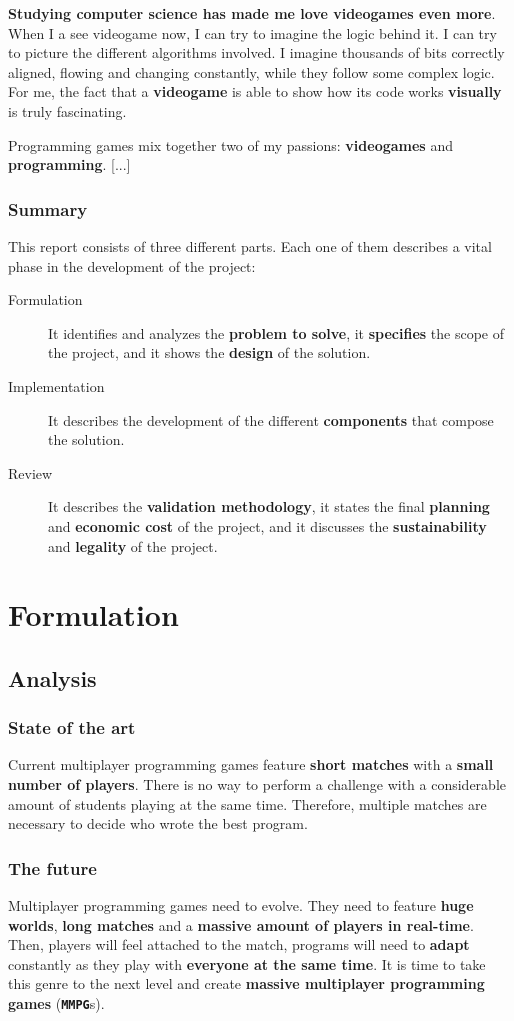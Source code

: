 \documentclass[a4paper,11pt,titlepage,abstract,numbers=noenddot,automark,mnsy,intlimits,rgb,dvipsnames]{report}
\begin{document}
\textbf{Studying computer science has made me love videogames even more}. When I a see videogame now, I can try to
imagine the logic
behind it. I can try to picture the different algorithms involved. I imagine thousands of bits correctly aligned,
flowing and changing constantly, while they follow some complex logic. For me, the fact that a \textbf{videogame} is
able to show how its code works \textbf{visually} is truly fascinating.

Programming games mix together two of my passions: \textbf{videogames} and \textbf{programming}. [...]
\section{Summary}
This report consists of three different parts. Each one of them describes a vital phase in the development of
the project:
\begin{description}
\item[Formulation]
It identifies and analyzes the \textbf{problem to solve}, it \textbf{specifies} the scope of
  the project, and it shows the \textbf{design} of the solution.
\item[Implementation]
It describes the development of the different \textbf{components} that compose the solution.
\item[Review]
It describes the \textbf{validation methodology}, it states the final \textbf{planning} and \textbf{economic cost}
  of the project, and it discusses the \textbf{sustainability} and \textbf{legality} of the project.
\end{description}
\part{Formulation}
\chapter{Analysis}
\section{State of the art}
Current multiplayer programming games feature \textbf{short matches} with a \textbf{small number of players}. There
is no way to perform a challenge with a considerable amount of students playing at the same time. Therefore, multiple
matches are necessary to decide who wrote the best program.
\section{The future}
Multiplayer programming games need to evolve. They need to feature \textbf{huge worlds}, \textbf{long matches} and
a \textbf{massive amount of players in real-time}. Then, players will feel attached to the match, programs will need to
\textbf{adapt} constantly as they play with \textbf{everyone at the same time}. It is time to take this genre to the next level and
create \textbf{massive multiplayer programming games} (\textbf{\texttt{MMPG}}s).
\end{document}
